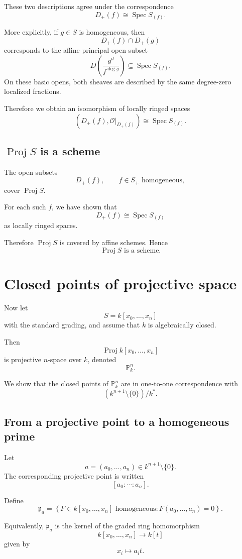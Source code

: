 \documentclass[12pt,a4paper]{article}
\DeclareMathOperator{\Spec}{Spec}
\DeclareMathOperator{\Proj}{Proj}
\theoremstyle{notespace}
\begin{document}
These two descriptions agree under the correspondence
\[
D_+(f)\cong \Spec S_{(f)}.
\]

More explicitly, if \(g\in S\) is homogeneous, then
\[
D_+(f)\cap D_+(g)
\]
corresponds to the affine principal open subset
\[
D\left(\frac{g^d}{f^{\deg g}}\right)
\subseteq \Spec S_{(f)}.
\]
On these basic opens, both sheaves are described by the same degree-zero localized
fractions.

Therefore we obtain an isomorphism of locally ringed spaces
\[
\boxed{
	\left(D_+(f),\mathcal O|_{D_+(f)}\right)
	\cong
	\Spec S_{(f)}.
}
\]

\subsection{\texorpdfstring{$\Proj S$}{Proj S} is a scheme}

The open subsets
\[
D_+(f),
\qquad f\in S_+ \text{ homogeneous},
\]
cover \(\Proj S\).

For each such \(f\), we have shown that
\[
D_+(f)\cong \Spec S_{(f)}
\]
as locally ringed spaces.

Therefore \(\Proj S\) is covered by affine schemes. Hence
\[
\boxed{
	\Proj S \text{ is a scheme.}
}
\]

\section{Closed points of projective space}

Now let
\[
S=k[x_0,\dots,x_n]
\]
with the standard grading, and assume that \(k\) is algebraically closed.

Then
\[
\Proj k[x_0,\dots,x_n]
\]
is projective \(n\)-space over \(k\), denoted
\[
\mathbb P_k^n.
\]

We show that the closed points of \(\mathbb P_k^n\) are in one-to-one correspondence with
\[
(k^{n+1}\setminus\{0\})/k^*.
\]

\subsection{From a projective point to a homogeneous prime}

Let
\[
a=(a_0,\dots,a_n)\in k^{n+1}\setminus\{0\}.
\]
The corresponding projective point is written
\[
[a_0:\cdots:a_n].
\]

Define
\[
\mathfrak p_a
=
\left\{
F\in k[x_0,\dots,x_n] \text{ homogeneous} :
F(a_0,\dots,a_n)=0
\right\}.
\]

Equivalently, \(\mathfrak p_a\) is the kernel of the graded ring homomorphism
\[
k[x_0,\dots,x_n]\longrightarrow k[t]
\]
given by
\[
x_i\longmapsto a_i t.
\]
\end{document}

